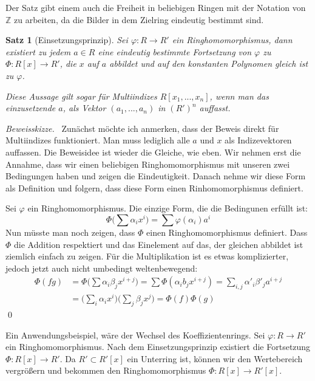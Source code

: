 \documentclass{article}
\newtheorem*{satz}{Satz}
\theoremstyle{definition}
\theoremstyle{remark}
\newenvironment{beweisskizze}{\par\noindent\textit{Beweisskizze.}\ }{\qed\vspace{0.7em}}
\begin{document}
Der Satz gibt einem auch die Freiheit in beliebigen Ringen mit der Notation von $\mathbb Z$ zu arbeiten, da die
Bilder in dem Zielring eindeutig bestimmt sind.

\begin{satz} [Einsetzungsprinzip] Sei $\varphi: R\to R'$ ein Ringhomomorphismus, dann existiert zu jedem
$a \in R$ eine eindeutig bestimmte Fortsetzung von $\varphi$ zu $\Phi:R[x] \to R'$, die $x$ auf $a$ abbildet und
auf den konstanten Polynomen gleich ist zu $\varphi$.

\vspace{0.7em}
Diese Aussage gilt sogar für Multiindizes $R[x_1,...,x_n]$, wenn man das einzusetzende $a$, als Vektor
$(a_1,...,a_n)$ in $(R')^n$ auffasst.
\end{satz}
\begin{beweisskizze} Zunächst möchte ich anmerken, dass der Beweis direkt für Multiindizes funktioniert.
Man muss lediglich alle $a$ und $x$ als Indizevektoren auffassen.
Die Beweisidee ist wieder die Gleiche, wie eben. Wir nehmen erst die Annahme, dass wir einen beliebigen
Ringhomomorphismus mit unseren zwei Bedingungen haben und zeigen die Eindeutigkeit. Danach nehme wir diese Form
als Definition und folgern, dass diese Form einen Rinhomomorphismus definiert.

\vspace{0.7em}
Sei $\varphi$ ein Ringhomomorphismus. Die einzige Form, die die Bedingunen erfüllt ist:
\[\Phi\Big(\sum \alpha_i x^i\Big) = \sum \varphi(\alpha_i) a^i\]
Nun müsste man noch zeigen, dass $\Phi$ einen Ringhomomorphismus definiert. Dass $\Phi$ die Addition respektiert
und das Einelement auf das, der gleichen abbildet ist ziemlich einfach zu zeigen. Für die Multiplikation ist es
etwas komplizierter, jedoch jetzt auch nicht umbedingt weltenbewegend:
\begin{align*}
\Phi(fg) &= \Phi\Big(\sum \alpha_i \beta_j x^{i+j}\Big)=\sum \Phi\left(\alpha_i b_j x^{i+j}\right)
=\sum_{i,j} \alpha'_i \beta'_j a^{i+j} \\
&=\Big(\sum_i \alpha_i x^i\Big) \Big(\sum_j \beta_j x^j\Big) = \Phi(f)\Phi(g)
\end{align*}
\end{beweisskizze}

Ein Anwendungsbeispiel, wäre der Wechsel des Koeffizientenrings. Sei $\varphi: R\to R'$ ein Ringhomomorphismus.
Nach dem Einsetzungsprinzip existiert die Fortsetzung $\Phi:R[x]\to R'$. Da $R'\subset R'[x]$ ein
Unterring ist, können wir den Wertebereich vergrößern und bekommen den Ringhomomorphismus $\Phi:R[x]\to R'[x]$.
\end{document}
